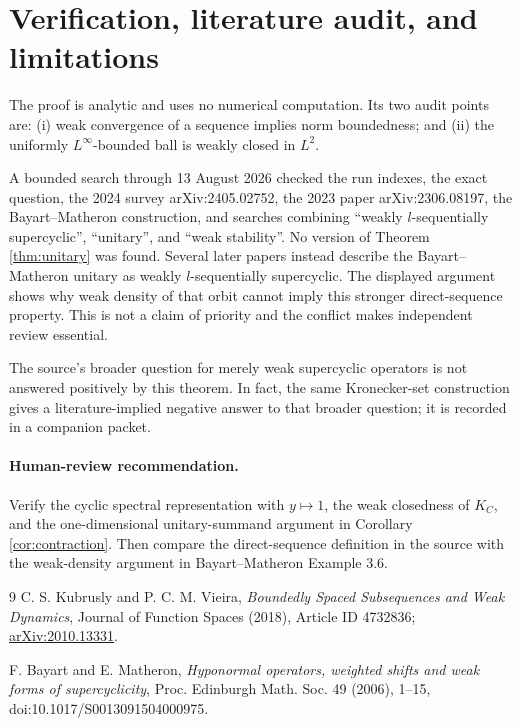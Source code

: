 \documentclass[10pt]{article}
\begin{document}
\section{Verification, literature audit, and limitations}
The proof is analytic and uses no numerical computation.  Its two audit
points are: (i) weak convergence of a sequence implies norm boundedness; and
(ii) the uniformly $L^\infty$-bounded ball is weakly closed in $L^2$.

A bounded search through 13 August 2026 checked the run indexes, the exact
question, the 2024 survey arXiv:2405.02752, the 2023 paper
arXiv:2306.08197, the Bayart--Matheron construction, and searches combining
``weakly $l$-sequentially supercyclic'', ``unitary'', and ``weak stability''.
No version of Theorem \ref{thm:unitary} was found.  Several later papers
instead describe the Bayart--Matheron unitary as weakly
$l$-sequentially supercyclic.  The displayed argument shows why weak density
of that orbit cannot imply this stronger direct-sequence property.  This is
not a claim of priority and the conflict makes independent review essential.

The source's broader question for merely weak supercyclic operators is not
answered positively by this theorem.  In fact, the same Kronecker-set
construction gives a literature-implied negative answer to that broader
question; it is recorded in a companion packet.

\paragraph{Human-review recommendation.}
Verify the cyclic spectral representation with $y\mapsto1$, the weak
closedness of $K_C$, and the one-dimensional unitary-summand argument in
Corollary \ref{cor:contraction}.  Then compare the direct-sequence definition
in the source with the weak-density argument in Bayart--Matheron Example 3.6.

\begin{thebibliography}{9}
C. S. Kubrusly and P. C. M. Vieira,
\emph{Boundedly Spaced Subsequences and Weak Dynamics},
Journal of Function Spaces (2018), Article ID 4732836;
\href{https://arxiv.org/abs/2010.13331}{arXiv:2010.13331}.

F. Bayart and E. Matheron,
\emph{Hyponormal operators, weighted shifts and weak forms of
supercyclicity}, Proc. Edinburgh Math. Soc. 49 (2006), 1--15,
doi:10.1017/S0013091504000975.
\end{thebibliography}
\end{document}
